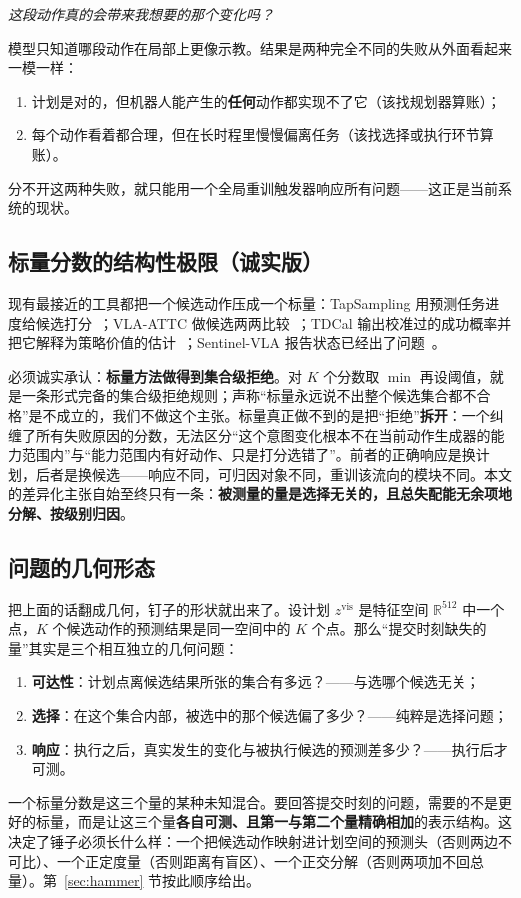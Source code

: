 \documentclass[11pt,a4paper]{ctexart}
\newcommand{\zvis}{z^{\mathrm{vis}}}
\begin{document}
\begin{center}
\emph{这段动作真的会带来我想要的那个变化吗？}
\end{center}

模型只知道哪段动作在局部上更像示教。结果是两种完全不同的失败从外面看起来一模一样：
\begin{enumerate}[label=(\alph*),itemsep=1pt]
  \item 计划是对的，但机器人能产生的\textbf{任何}动作都实现不了它（该找规划器算账）；
  \item 每个动作看着都合理，但在长时程里慢慢偏离任务（该找选择或执行环节算账）。
\end{enumerate}
分不开这两种失败，就只能用一个全局重训触发器响应所有问题——这正是当前系统的现状。

\subsection{标量分数的结构性极限（诚实版）}\label{sec:scalar}

现有最接近的工具都把一个候选动作压成一个标量：TapSampling 用预测任务进度给候选打分~\cite{tapsampling}；VLA-ATTC 做候选两两比较~\cite{vlaattc}；TDCal 输出校准过的成功概率并把它解释为策略价值的估计~\cite{tdcal}；Sentinel-VLA 报告状态已经出了问题~\cite{sentinel}。

必须诚实承认：\textbf{标量方法做得到集合级拒绝}。对 $K$ 个分数取 $\min$ 再设阈值，就是一条形式完备的集合级拒绝规则；声称``标量永远说不出整个候选集合都不合格''是不成立的，我们不做这个主张。标量真正做不到的是把``拒绝''\textbf{拆开}：一个纠缠了所有失败原因的分数，无法区分``这个意图变化根本不在当前动作生成器的能力范围内''与``能力范围内有好动作、只是打分选错了''。前者的正确响应是换计划，后者是换候选——响应不同，可归因对象不同，重训该流向的模块不同。本文的差异化主张自始至终只有一条：\textbf{被测量的量是选择无关的，且总失配能无余项地分解、按级别归因}。

\subsection{问题的几何形态}\label{sec:geometry}

把上面的话翻成几何，钉子的形状就出来了。设计划 $\zvis$ 是特征空间 $\mathbb{R}^{512}$ 中一个点，$K$ 个候选动作的预测结果是同一空间中的 $K$ 个点。那么``提交时刻缺失的量''其实是三个相互独立的几何问题：
\begin{enumerate}[itemsep=1pt]
  \item \textbf{可达性}：计划点离候选结果所张的集合有多远？——与选哪个候选无关；
  \item \textbf{选择}：在这个集合内部，被选中的那个候选偏了多少？——纯粹是选择问题；
  \item \textbf{响应}：执行之后，真实发生的变化与被执行候选的预测差多少？——执行后才可测。
\end{enumerate}
一个标量分数是这三个量的某种未知混合。要回答提交时刻的问题，需要的不是更好的标量，而是让这三个量\textbf{各自可测、且第一与第二个量精确相加}的表示结构。这决定了锤子必须长什么样：一个把候选动作映射进计划空间的预测头（否则两边不可比）、一个正定度量（否则距离有盲区）、一个正交分解（否则两项加不回总量）。第~\ref{sec:hammer} 节按此顺序给出。
\end{document}
